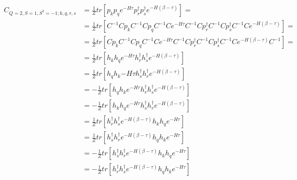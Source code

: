 \begin{equation*}
  \begin{aligned}
    C_{Q=2,S=1,S^3=-1;k,q,r,s} &= \frac{1}{Z}tr\left[p_kp_qe^{-H\tau}p^\dagger_rp^\dagger_se^{-H\left(\beta-\tau\right)}\right] = 
    \\
    &= \frac{1}{Z}tr\left[C^{-1}Cp_kC^{-1}Cp_qC^{-1}Ce^{-H\tau}C^{-1}Cp^\dagger_rC^{-1}Cp^\dagger_sC^{-1}Ce^{-H\left(\beta-\tau\right)}\right] = 
    \\
    &= \frac{1}{Z}tr\left[Cp_kC^{-1}Cp_qC^{-1}Ce^{-H\tau}C^{-1}Cp^\dagger_rC^{-1}Cp^\dagger_sC^{-1}Ce^{-H\left(\beta-\tau\right)}C^{-1}\right] = 
    \\
    &= \frac{1}{Z}tr\left[h_kh_qe^{-H\tau}h^\dagger_rh^\dagger_se^{-H\left(\beta-\tau\right)}\right]
    \\
    &= \frac{1}{Z}tr\left[h_qh_k{-H\tau}h^\dagger_sh^\dagger_re^{-H\left(\beta-\tau\right)}\right]
    \\
    &= - \frac{1}{Z}tr\left[h_qh_ke^{-H\tau}h^\dagger_rh^\dagger_se^{-H\left(\beta-\tau\right)}\right]
    \\
    &= - \frac{1}{Z}tr\left[h_kh_qe^{-H\tau}h^\dagger_sh^\dagger_re^{-H\left(\beta-\tau\right)}\right]
    \\
    &= \frac{1}{Z}tr\left[h^\dagger_rh^\dagger_se^{-H\left(\beta-\tau\right)}h_kh_qe^{-H\tau}\right]
    \\
    &= \frac{1}{Z}tr\left[h^\dagger_sh^\dagger_re^{-H\left(\beta-\tau\right)}h_qh_ke^{-H\tau}\right]
    \\
    &= - \frac{1}{Z}tr\left[h^\dagger_sh^\dagger_re^{-H\left(\beta-\tau\right)}h_kh_qe^{-H\tau}\right]
    \\
    &= - \frac{1}{Z}tr\left[h^\dagger_rh^\dagger_se^{-H\left(\beta-\tau\right)}h_qh_ke^{-H\tau}\right]
    \\
  \end{aligned}
\end{equation*}

